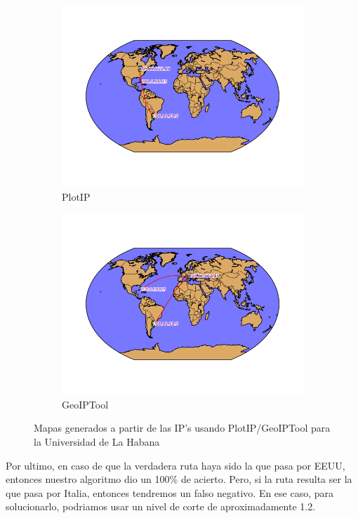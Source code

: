 \begin{figure}[ht]
	\begin{subfigure}[b]{0.5\textwidth}
		\centering
		\includegraphics[width=\linewidth]{imagenes/mapa_habana_plotip.png}
		\caption{PlotIP}
	\end{subfigure}
	\begin{subfigure}[b]{0.5\textwidth}
		\centering
		\includegraphics[width=\linewidth]{imagenes/mapa_habana_geoip.png}
		\caption{GeoIPTool}
	\end{subfigure}
	\caption{Mapas generados a partir de las IP's usando PlotIP/GeoIPTool para la Universidad de La Habana}
\end{figure}

Por ultimo, en caso de que la verdadera ruta haya sido la que pasa por EEUU, entonces
nuestro algoritmo dio un 100\% de acierto. Pero, si la ruta resulta ser la que pasa
por Italia, entonces tendremos un falso negativo. En ese caso, para solucionarlo, podriamos
usar un nivel de corte de aproximadamente 1.2.

